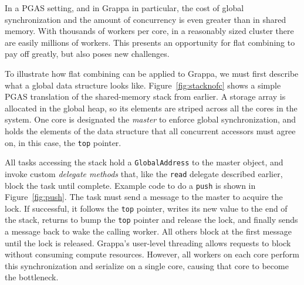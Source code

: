
In a PGAS setting, and in Grappa in particular, the cost of global synchronization and the amount of concurrency is even greater than in shared memory. With thousands of workers per core, in a reasonably sized cluster there are easily millions of workers. This presents an opportunity for flat combining to pay off greatly, but also poses new challenges.


To illustrate how flat combining can be applied to Grappa, we must first describe what a global data structure looks like. Figure~\ref{fig:stacknofc} shows a simple PGAS translation of the shared-memory stack from earlier. A storage array is allocated in the global heap, so its elements are striped across all the cores in the system. One core is designated the \emph{master} to enforce global synchronization, and holds the elements of the data structure that all concurrent accessors must agree on, in this case, the \texttt{top} pointer.

All tasks accessing the stack hold a \texttt{GlobalAddress} to the master object, and invoke custom \emph{delegate methods} that, like the \texttt{read} delegate described earlier, block the task until complete. Example code to do a \texttt{push} is shown in Figure~\ref{fig:push}. The task must send a message to the master to acquire the lock. If successful, it follows the \texttt{top} pointer, writes its new value to the end of the stack, returns to bump the \texttt{top} pointer and release the lock, and finally sends a message back to wake the calling worker. All others block at the first message until the lock is released. Grappa's user-level threading allows requests to block without consuming compute resources. However, all workers on each core perform this synchronization and serialize on a single core, causing that core to become the bottleneck.

